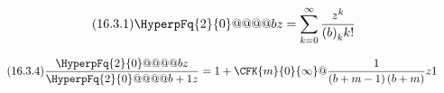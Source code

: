 \documentclass[11pt]{article}
\begin{document}
\begin{equation*}\tag{16.3.1}
  \HyperpFq{2}{0}@@@@{}{b}{z}
  =  \sum_{k=0}^\infty \frac{z^{k}}{\pochhammer{b}{k}k!}
\end{equation*}

\begin{equation*}\tag{16.3.4}
  \frac{\HyperpFq{2}{0}@@@@{}{b}{z}}{\HyperpFq{2}{0}@@@@{}{b+1}{z}}
  = 1+\CFK{m}{0}{\infty}@{\frac{1}{\left(b+m-1\right)\left(b+m\right)}z}{1}
\end{equation*}
\end{document}
